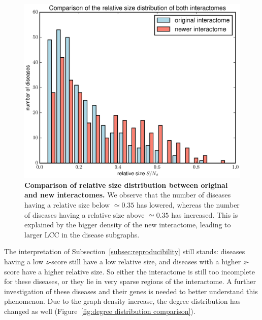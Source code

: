 \documentclass[letterpaper]{article}
\begin{document}
	\begin{figure}[!h]
		\hspace{-.6cm}
		\includegraphics[width=.55\textwidth]{images/rel_sizes_comparison.eps}
		\vspace{-.5cm}
		\caption{{\bf Comparison of relative size distribution between original and new interactomes.}
		We observe that the number of diseases having a relative size below $\simeq 0.35$ has lowered, whereas the number
		of diseases having a relative size above $\simeq 0.35$ has increased. This is explained by the bigger density of
		the new interactome, leading to larger LCC in the disease subgraphs.
		\label{fig:rel sizes comparison}}
		\vspace{-.1cm}
	\end{figure}

	The interpretation of Subsection~\ref{subsec:reproducibility} still stands: diseases having
	a low $z$-score still have a low relative size, and diseases with a higher $z$-score have a higher
	relative size. So either the interactome is still too incomplete for these diseases, or they lie in
	very sparse regions of the interactome. A further investigation of these diseases and their genes
	is needed to better understand this phenomenon. Due to the graph density increase, the degree
	distribution has changed as well (Figure~\ref{fig:degree distribution comparison}).
\end{document}
